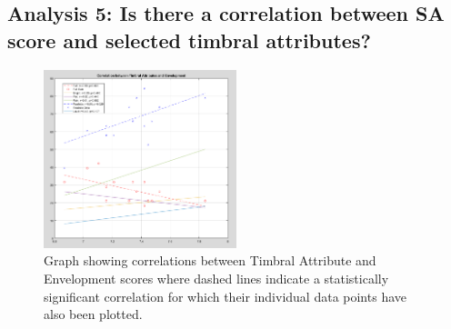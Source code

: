 	\subsection{Analysis 5: Is there a correlation between SA score and selected timbral attributes?}



		\begin{figure}
			\includegraphics[width=0.5\textwidth]{images/plots/sa_ta_corr_env.PNG}
			\caption{Graph showing correlations between Timbral Attribute and Envelopment scores where dashed lines indicate a statistically significant correlation for which their individual data points have also been plotted.}
			\label{image:corr_env} 
		\end{figure}		
